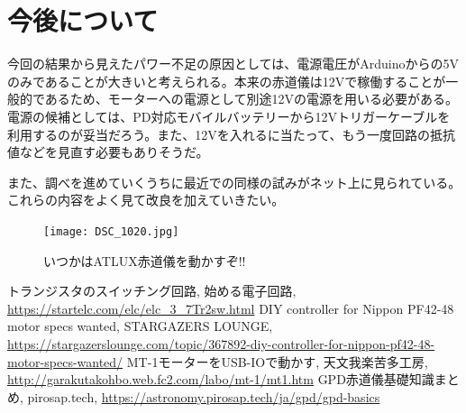\documentclass[../../main]{subfiles}
\begin{document}
\section{今後について}
今回の結果から見えたパワー不足の原因としては、電源電圧がArduinoからの5Vのみであることが大きいと考えられる。本来の赤道儀は12Vで稼働することが一般的であるため、モーターへの電源として別途12Vの電源を用いる必要がある。
電源の候補としては、PD対応モバイルバッテリーから12Vトリガーケーブルを利用するのが妥当だろう。また、12Vを入れるに当たって、もう一度回路の抵抗値などを見直す必要もありそうだ。

また、調べを進めていくうちに最近での同様の試みがネット上に見られている。これらの内容をよく見て改良を加えていきたい。

\vspace{2\zw}
\begin{figure}
  \centering
  \texttt{[image: DSC\_1020.jpg]}
  \caption{\Large いつかはATLUX赤道儀を動かすぞ!!}
  \label{fig:ATLUX}
\end{figure}

\begin{thebibliography}{9}
  トランジスタのスイッチング回路, 始める電子回路, \url{https://startelc.com/elc/elc_3_7Tr2sw.html}
  DIY controller for Nippon PF42-48 motor specs wanted, STARGAZERS LOUNGE, \url{https://stargazerslounge.com/topic/367892-diy-controller-for-nippon-pf42-48-motor-specs-wanted/}
  MT-1モーターをUSB-IOで動かす, 天文我楽苦多工房, \url{http://garakutakohbo.web.fc2.com/labo/mt-1/mt1.htm}
  GPD赤道儀基礎知識まとめ, pirosap.tech, \url{https://astronomy.pirosap.tech/ja/gpd/gpd-basics}
\end{thebibliography}
\end{document}
